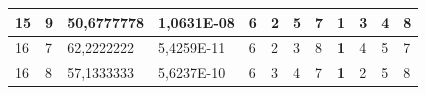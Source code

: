 \documentclass[conference]{IEEEtran}
\begin{document}
\begin{table}[]
\begin{tabular}{|llll|llllllll|}
\multicolumn{1}{|l|}{15}                                                    & \multicolumn{1}{l|}{9}                                                        & \multicolumn{1}{l|}{50,6777778}                                                   & 1,0631E-08                     & \multicolumn{1}{l|}{6}                                                  & \multicolumn{1}{l|}{2}                                                  & \multicolumn{1}{l|}{5}                                                  & \multicolumn{1}{l|}{7}                                                  & \multicolumn{1}{l|}{\textbf{1}}                                         & \multicolumn{1}{l|}{3}                                                  & \multicolumn{1}{l|}{4}                                                  & 8                          \\ \hline
\multicolumn{1}{|l|}{16}                                                    & \multicolumn{1}{l|}{7}                                                        & \multicolumn{1}{l|}{62,2222222}                                                   & 5,4259E-11                     & \multicolumn{1}{l|}{6}                                                  & \multicolumn{1}{l|}{2}                                                  & \multicolumn{1}{l|}{3}                                                  & \multicolumn{1}{l|}{8}                                                  & \multicolumn{1}{l|}{\textbf{1}}                                         & \multicolumn{1}{l|}{4}                                                  & \multicolumn{1}{l|}{5}                                                  & 7                          \\ \hline
\multicolumn{1}{|l|}{16}                                                    & \multicolumn{1}{l|}{8}                                                        & \multicolumn{1}{l|}{57,1333333}                                                   & 5,6237E-10                     & \multicolumn{1}{l|}{6}                                                  & \multicolumn{1}{l|}{3}                                                  & \multicolumn{1}{l|}{4}                                                  & \multicolumn{1}{l|}{7}                                                  & \multicolumn{1}{l|}{\textbf{1}}                                         & \multicolumn{1}{l|}{2}                                                  & \multicolumn{1}{l|}{5}                                                  & 8                          \\ \hline

\end{tabular}
\end{table}
\end{document}
